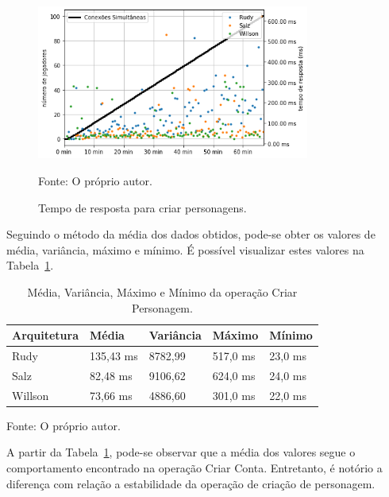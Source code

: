 \begin{figure}[htb!]
  \caption{Tempo de resposta para criar personagens.}
  \label{fig:create_character_operation_request}
  \includegraphics[width=0.8\textwidth]{figuras/analise/rt/create_character_operation_request.png}
  \centering

  Fonte: O próprio autor.
\end{figure}



Seguindo o método da média dos dados obtidos, pode-se obter os valores de média, variância, máximo e mínimo.
%
É possível visualizar estes valores na Tabela~\ref{tab:create_character_operation_request}.
\pagebreak
\begin{table}[htb!]
\centering
\begin{adjustbox}{max width=\textwidth}
\caption{Média, Variância, Máximo e Mínimo da operação Criar Personagem.}
\vspace{-0.3cm}
\label{tab:create_character_operation_request}
\begin{tabular}{l|l|l|l|l}
\hline \hline
Arquitetura & Média     & Variância & Máximo    & Mínimo  \\ \hline \hline
Rudy        & 135,43 ms & 8782,99 & 517,0 ms & 23,0 ms \\ \hline
Salz        & 82,48 ms & 9106,62  & 624,0 ms & 24,0 ms \\ \hline
Willson     & 73,66 ms & 4886,60  & 301,0 ms  & 22,0 ms \\ \hline \hline
\end{tabular}

\end{adjustbox}

Fonte: O próprio autor.
\end{table}

\vspace{-0.3cm}
A partir da Tabela~\ref{tab:create_character_operation_request}, pode-se observar que a média dos valores segue o comportamento encontrado na operação Criar Conta.
%
Entretanto, é notório a diferença com relação a estabilidade da operação de criação de personagem.

